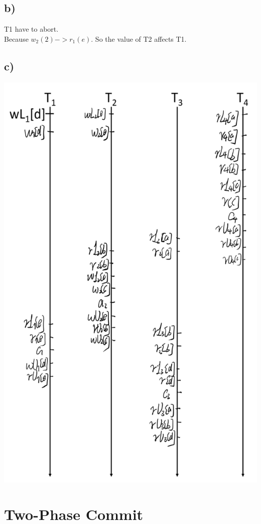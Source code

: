 \documentclass{article}
\begin{document}
\subsection*{b)}
T1 have to abort.\\ Because $w_2(2)->r_1(e)$. So the value of T2 affects T1.
\subsection*{c)}
\includegraphics[scale=0.6]{03.png}
\section{Two-Phase Commit}
\end{document}
